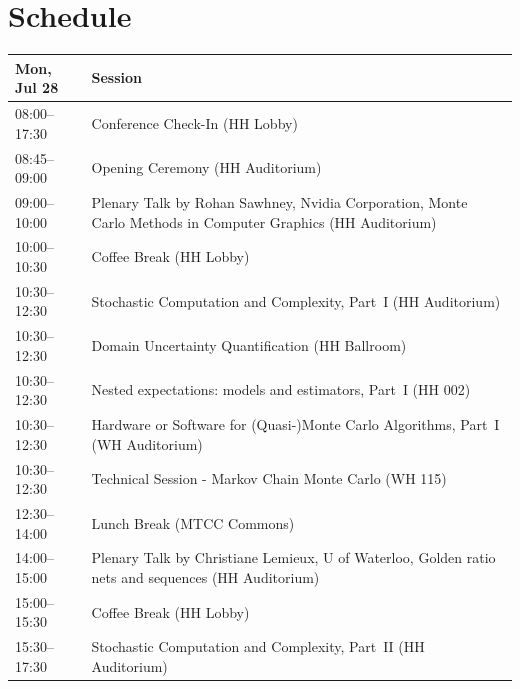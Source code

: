 \chapter{Schedule}
\begin{table}
{\footnotesize
\begin{tabularx}{\textwidth}{>{\hsize=0.32\hsize}X|>{\hsize=1.7\hsize}X}
\hline
\textbf{Mon, Jul 28} & \textbf{Session} \\
\hline
\cellcolor{\SessionTitleColor}08:00--17:30 & \cellcolor{\SessionTitleColor}Conference Check-In (HH Lobby) \\
\cellcolor{\OpeningClosingColor}08:45--09:00 & \cellcolor{\OpeningClosingColor}Opening Ceremony (HH Auditorium) \\
\cellcolor{\PlenaryColor}09:00--10:00 & \cellcolor{\PlenaryColor}Plenary Talk by Rohan Sawhney, Nvidia Corporation, Monte Carlo Methods in Computer Graphics (HH Auditorium) \\
\cellcolor{\EmptyColor}10:00--10:30 & \cellcolor{\EmptyColor}Coffee Break (HH Lobby) \\
\cellcolor{\SessionTitleColor}10:30--12:30 & \cellcolor{\SessionTitleColor}Stochastic Computation and Complexity, Part~I (HH Auditorium) \\
\cellcolor{\SessionTitleColor}10:30--12:30 & \cellcolor{\SessionTitleColor}Domain Uncertainty Quantification (HH Ballroom) \\
\cellcolor{\SessionTitleColor}10:30--12:30 & \cellcolor{\SessionTitleColor}Nested expectations: models and estimators, Part~I (HH 002) \\
\cellcolor{\SessionTitleColor}10:30--12:30 & \cellcolor{\SessionTitleColor}Hardware or Software for (Quasi-)Monte Carlo Algorithms, Part~I (WH Auditorium) \\
\cellcolor{\SessionLightColor}10:30--12:30 & \cellcolor{\SessionLightColor}Technical Session - Markov Chain Monte Carlo (WH 115) \\
\cellcolor{\EmptyColor}12:30--14:00 & \cellcolor{\EmptyColor}Lunch Break (MTCC Commons) \\
\cellcolor{\PlenaryColor}14:00--15:00 & \cellcolor{\PlenaryColor}Plenary Talk by Christiane Lemieux, U of Waterloo, Golden ratio nets and sequences (HH Auditorium) \\
\cellcolor{\EmptyColor}15:00--15:30 & \cellcolor{\EmptyColor}Coffee Break (HH Lobby) \\
\cellcolor{\SessionTitleColor}15:30--17:30 & \cellcolor{\SessionTitleColor}Stochastic Computation and Complexity, Part~II (HH Auditorium) \\

\end{tabularx}}
\end{table}
